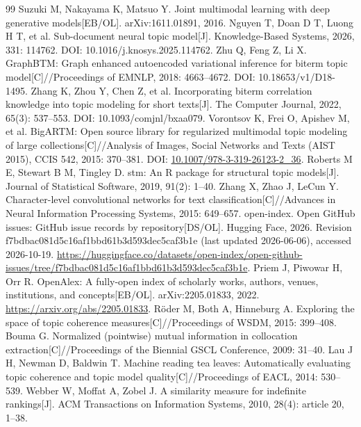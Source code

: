 \documentclass[11pt]{article}
\begin{document}
\begin{thebibliography}{99}
 Suzuki M, Nakayama K, Matsuo Y. Joint multimodal learning with deep generative models[EB/OL]. arXiv:1611.01891, 2016.
 Nguyen T, Doan D T, Luong H T, et al. Sub-document neural topic model[J]. Knowledge-Based Systems, 2026, 331: 114762. DOI: 10.1016/j.knosys.2025.114762.
 Zhu Q, Feng Z, Li X. GraphBTM: Graph enhanced autoencoded variational inference for biterm topic model[C]//Proceedings of EMNLP, 2018: 4663--4672. DOI: 10.18653/v1/D18-1495.
 Zhang K, Zhou Y, Chen Z, et al. Incorporating biterm correlation knowledge into topic modeling for short texts[J]. The Computer Journal, 2022, 65(3): 537--553. DOI: 10.1093/comjnl/bxaa079.
 Vorontsov K, Frei O, Apishev M, et al. BigARTM: Open source library for regularized multimodal topic modeling of large collections[C]//Analysis of Images, Social Networks and Texts (AIST 2015), CCIS 542, 2015: 370--381. DOI: \url{10.1007/978-3-319-26123-2_36}.
 Roberts M E, Stewart B M, Tingley D. stm: An R package for structural topic models[J]. Journal of Statistical Software, 2019, 91(2): 1--40.
 Zhang X, Zhao J, LeCun Y. Character-level convolutional networks for text classification[C]//Advances in Neural Information Processing Systems, 2015: 649--657.
 open-index. Open GitHub issues: GitHub issue records by repository[DS/OL]. Hugging Face, 2026. Revision f7bdbac081d5c16af1bbd61b3d593dec5caf3b1e (last updated 2026-06-06), accessed 2026-10-19. \url{https://huggingface.co/datasets/open-index/open-github-issues/tree/f7bdbac081d5c16af1bbd61b3d593dec5caf3b1e}.
 Priem J, Piwowar H, Orr R. OpenAlex: A fully-open index of scholarly works, authors, venues, institutions, and concepts[EB/OL]. arXiv:2205.01833, 2022. \url{https://arxiv.org/abs/2205.01833}.
 R\"oder M, Both A, Hinneburg A. Exploring the space of topic coherence measures[C]//Proceedings of WSDM, 2015: 399--408.
 Bouma G. Normalized (pointwise) mutual information in collocation extraction[C]//Proceedings of the Biennial GSCL Conference, 2009: 31--40.
 Lau J H, Newman D, Baldwin T. Machine reading tea leaves: Automatically evaluating topic coherence and topic model quality[C]//Proceedings of EACL, 2014: 530--539.
 Webber W, Moffat A, Zobel J. A similarity measure for indefinite rankings[J]. ACM Transactions on Information Systems, 2010, 28(4): article 20, 1--38.

\end{thebibliography}
\end{document}
